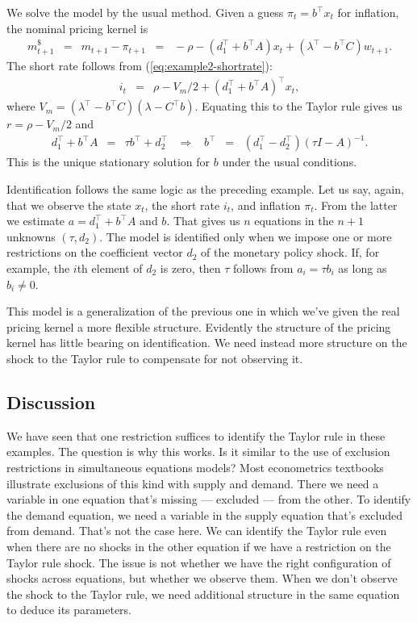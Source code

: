 \documentclass[11pt]{article}
\newcounter{fig}
\begin{document}
{We solve the model by the usual method.
Given a guess $\pi_t = b^\top x_t$ for inflation,
the nominal pricing kernel is
\begin{eqnarray*}
    m^{\$}_{t+1} &=& m_{t+1} - \pi_{t+1}
            \;\;=\;\; - \rho - (d_1^\top + b^\top  A ) x_t + (\lambda^\top - b^\top C) w_{t+1} .
\end{eqnarray*}
The short rate follows from (\ref{eq:example2-shortrate}):
\begin{eqnarray*}
    i_t &=& \rho - V_m/2 + (d_1^\top + b^\top  A )^\top x_t ,
\end{eqnarray*}
where $V_m = (\lambda^\top - b^\top C)(\lambda - C^\top b)$.
Equating this to the Taylor rule gives us
$ r = \rho - V_m/2$ and
\begin{eqnarray*}
    d_1^\top + b^\top  A  &=& \tau b^\top + d_2^\top
    \;\;\;\Rightarrow\;\;\;
    b^\top \;\;=\;\; (d_1^\top - d_2^\top) (\tau I -  A )^{-1} .
\end{eqnarray*}
This is the unique stationary solution for $b$ under the usual conditions.

Identification follows the same logic as the preceding example.
Let us say, again, that we observe the state $x_t$, the short rate $i_t$,
and inflation $\pi_t$.
From the latter we estimate $a = d_1^\top + b^\top A$ and $b$.
That gives us $n$ equations in the $n+1$ unknowns $(\tau, d_2)$.
The model is identified only when we impose one or more
restrictions on the coefficient vector $d_2$ of the monetary policy shock.
If, for example, the $i$th element of $d_2$ is zero,
then $\tau$ follows from $a_i = \tau b_i$ as long as $b_i \neq 0$.

This model is a generalization of the previous one in which we've given
the real pricing kernel a more flexible structure.
Evidently the structure of the pricing kernel has little bearing on identification.
We need instead more structure on the shock to the Taylor rule to compensate
for not observing it.


\subsection{Discussion}
\label{sec:macro-fin-discussion}

We have seen that one restriction suffices to identify the Taylor rule
in these examples.
The question is why this works.
Is it similar to the use of exclusion restrictions in simultaneous equations models?
Most econometrics textbooks illustrate exclusions of this kind with supply and demand.
There we need a variable in one equation that's missing --- excluded ---
from the other.
To identify the demand equation,
we need a variable in the supply equation that's excluded from demand.
That's not the case here.
We can identify the Taylor rule even when there are no shocks in
the other equation if we have a restriction on the Taylor rule shock.
The issue is not whether we have the right
configuration of shocks across equations, but whether we observe them.
When we don't observe the shock to the Taylor rule,
we need additional structure in the same equation to deduce its parameters.

}
\end{document}
